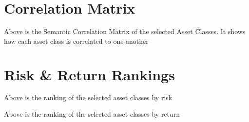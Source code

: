 \documentclass{article}
\begin{document}
\begin{landscape}

\section{Correlation Matrix}

\vspace{1cm}

\begin{center}


\scriptsize
\vspace{0.3cm}

    Above is the Semantic Correlation Matrix of the selected Asset Classes. It shows how each asset class is correlated to one another

\end{center}


\vspace{1cm}

\newpage  %

\section{Risk \& Return Rankings}

\vspace{2cm}

\begin{center}

\vspace{0.3cm}

    Above is the ranking of the selected asset classes by risk

\end{center}

\vspace{1cm}


\begin{center}

    \vspace{0.3cm}

    Above is the ranking of the selected asset classes by return

\end{center}

\end{landscape}
\newpage
\end{document}
